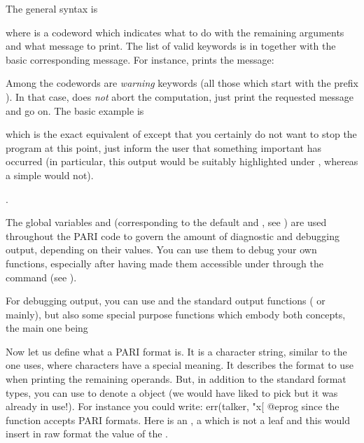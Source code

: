 \noindent
The general syntax is


\noindent where  is a codeword which indicates what to do with
the remaining arguments and what message to print. The list of valid keywords
is in  together with the basic corresponding
message. For instance,  prints the message:


\noindent
Among the codewords are \emph{warning} keywords (all those which start with
the prefix ). In that case,  does \emph{not} abort the
computation, just print the requested message and go on. The basic example is


\noindent which is the exact equivalent of  except that
you certainly do not want to stop the program at this point, just inform the
user that something important has occurred (in particular, this output would be
suitably highlighted under , whereas a simple  would not).

.\label{se:dbg_output}

\noindent
The global variables  and  (corresponding
to the default  and , see )
are used throughout the PARI code to govern the amount of diagnostic and
debugging output, depending on their values. You can use them to debug your
own functions, especially after having made them accessible under  through
the command  (see ).

For debugging output, you can use  and the standard output
functions ( or  mainly), but also some special purpose
functions which embody both concepts, the main one being


\noindent
Now let us define what a PARI format is. It is a character string, similar
to the one  uses, where \kbd{\%} characters have a special
meaning. It describes the format to use when printing the remaining operands.
But, in addition to the standard format types, you can use  to
denote a  object (we would have liked to pick  but it was
already in use!). For instance you could write:
\bprog
err(talker, "x[%
@eprog
\noindent since the  function accepts PARI formats. Here 
is an ,  a  which is not a leaf and this would
insert in raw format the value of the  .

